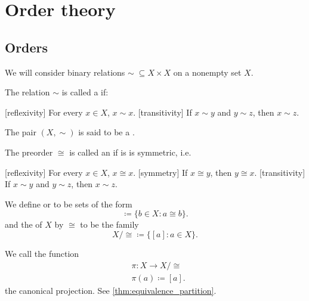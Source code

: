 \section{Order theory}\label{sec:order_theory}
\subsection{Orders}\label{subsec:orders}

\begin{definition}\label{def:order}
  We will consider binary relations \( \sim\; \subseteq X \times X \) on a nonempty set \( X \).

  \begin{defenum}
    \cite{nLab:preorder} The relation \( \sim \) is called a  if:
    \begin{description}
      [reflexivity] For every \( x \in X \), \( x \sim x \).
      [transitivity] If \( x \sim y \) and \( y \sim z \), then \( x \sim z \).
    \end{description}

    The pair \( (X, \sim) \) is said to be a .

    \cite[56]{Enderton1977} The preorder \( \cong \) is called an  if is is symmetric, i.e.
    \begin{description}
      [reflexivity] For every \( x \in X \), \( x \cong x \).
      [symmetry] If \( x \cong y \), then \( y \cong x \).
      [transitivity] If \( x \sim y \) and \( y \sim z \), then \( x \sim z \).
    \end{description}

    We define  or  to be sets of the form
    \begin{equation*}
      [a] \coloneqq \{ b \in X \colon a \cong b \}.
    \end{equation*}
    and the  of \( X \) by \( \cong \) to be the family
    \begin{equation*}
      X / \cong \coloneqq \{ [a] \colon a \in X \}.
    \end{equation*}

    We call the function
    \begin{align*}
      &\pi: X \to X / \cong \\
      &\pi(a) \coloneqq [a].
    \end{align*}
    the canonical projection. See \cref{thm:equivalence_partition}.


\end{defenum}
\end{definition}
